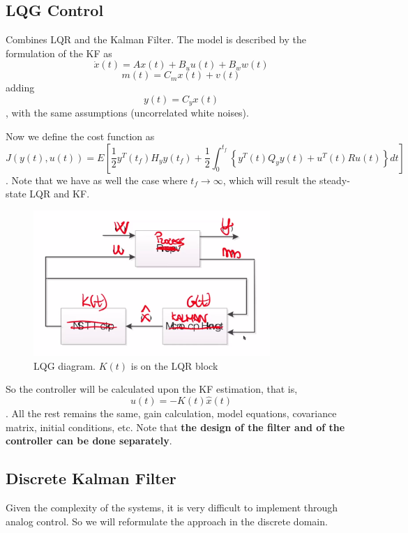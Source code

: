 \subsection*{LQG Control}

Combines LQR and the Kalman Filter. The model is described by the formulation of the KF as \[
    \dot{x}(t)=Ax(t) + B_uu(t) + B_ww(t)
\] \[
m(t) = C_mx(t) + v(t)
\] adding \[
y(t)=C_yx(t)
\], with the same assumptions (uncorrelated white noises).

Now we define the cost function as \[
    J(y(t),u(t))=E\left[ \frac{1}{2}y^{T}(t_f)H_yy(t_f) + \frac{1}{2}\int_0^{t_f}\left\{ y^{T}(t)Q_yy(t)+u^{T}(t)Ru(t) \right\} dt \right] 
\]. Note that we have as well the case where $t_f\to \infty$, which will result the steady-state LQR and KF.

\begin{figure}[h]
    \centering
    \includegraphics[width=0.8\textwidth]{figures/LQG_diagram.png}
    \caption{LQG diagram. $K(t)$ is on the LQR block}
    \label{fig:LQG-diagram}
\end{figure}

So the controller will be calculated upon the KF estimation, that is, \[
u(t)=-K(t)\hat{x}(t)
\] . All the rest remains the same, gain calculation, model equations, covariance matrix, initial conditions, etc. Note that \textbf{the design of the filter and of the controller can be done separately}.

\subsection*{Discrete Kalman Filter}

Given the complexity of the systems, it is very difficult to implement through analog control. So we will reformulate the approach in the discrete domain.

